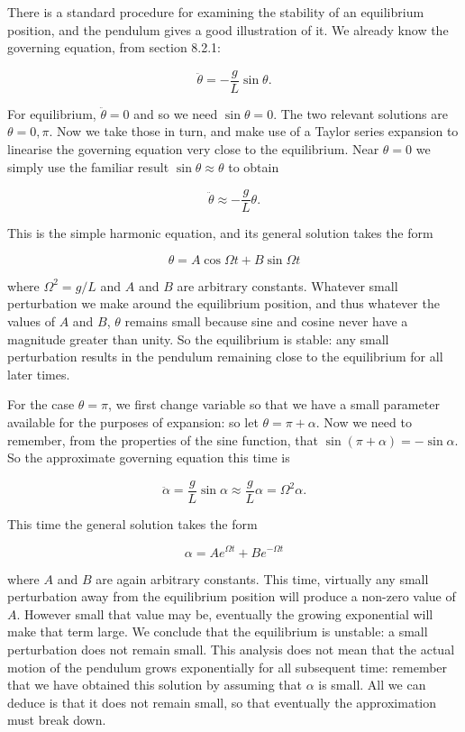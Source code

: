   There is a standard procedure for examining the stability of an equilibrium 
  position, and the pendulum gives a good illustration of it. We already know 
  the governing equation, from section 8.2.1: 

  $$\ddot{\theta} = -\dfrac{g}{L} \sin \theta . \tag{1}$$ 

  For equilibrium, $\ddot{\theta}=0$ and so we need $\sin \theta =0$. The two 
  relevant solutions are $\theta=0,\pi$. Now we take those in turn, and make 
  use of a Taylor series expansion to linearise the governing equation very 
  close to the equilibrium. Near $\theta =0$ we simply use the familiar result 
  $\sin \theta \approx \theta$ to obtain 

  $$\ddot{\theta} \approx -\dfrac{g}{L} \theta . \tag{2}$$ 

  This is the simple harmonic equation, and its general solution takes the form 

  $$\theta = A \cos \Omega t + B \sin \Omega t \tag{3}$$ 

  where $\Omega^2=g/L$ and $A$ and $B$ are arbitrary constants. Whatever small 
  perturbation we make around the equilibrium position, and thus whatever the 
  values of $A$ and $B$, $\theta$ remains small because sine and cosine never 
  have a magnitude greater than unity. So the equilibrium is stable: any small 
  perturbation results in the pendulum remaining close to the equilibrium for 
  all later times. 

  For the case $\theta = \pi$, we first change variable so that we have a small 
  parameter available for the purposes of expansion: so let $\theta = \pi + 
  \alpha$. Now we need to remember, from the properties of the sine function, 
  that $\sin (\pi + \alpha) = -\sin \alpha$. So the approximate governing 
  equation this time is 

  $$\ddot{\alpha} = \dfrac{g}{L} \sin \alpha \approx \dfrac{g}{L} \alpha = 
  \Omega^2 \alpha. \tag{4}$$ 

  This time the general solution takes the form 

  $$\alpha = A e^{\Omega t} + B e^{-\Omega t} \tag{5}$$ 

  where $A$ and $B$ are again arbitrary constants. This time, virtually any 
  small perturbation away from the equilibrium position will produce a non-zero 
  value of $A$. However small that value may be, eventually the growing 
  exponential will make that term large. We conclude that the equilibrium is 
  unstable: a small perturbation does not remain small. This analysis does not 
  mean that the actual motion of the pendulum grows exponentially for all 
  subsequent time: remember that we have obtained this solution by assuming 
  that $\alpha$ is small. All we can deduce is that it does not remain small, 
  so that eventually the approximation must break down. 


